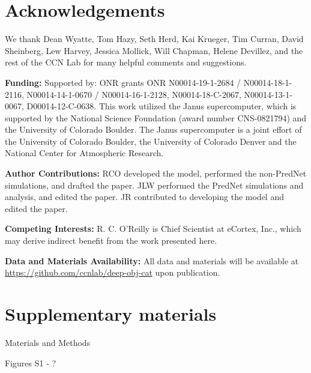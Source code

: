 \documentclass[12pt,twoside]{article}
\newif\myifpdf
\begin{document}


\section*{Acknowledgements}

We thank Dean Wyatte, Tom Hazy, Seth Herd, Kai Krueger, Tim Curran, David Sheinberg, Lew Harvey, Jessica Mollick, Will Chapman, Helene Devillez, and the rest of the CCN Lab for many helpful comments and suggestions.

  {\bf Funding:} Supported by: ONR grants ONR N00014-19-1-2684 / N00014-18-1-2116, N00014-14-1-0670 / N00014-16-1-2128, N00014-18-C-2067, N00014-13-1-0067, D00014-12-C-0638.  This work utilized the Janus supercomputer, which is supported by the National Science Foundation (award number CNS-0821794) and the University of Colorado Boulder. The Janus supercomputer is a joint effort of the University of Colorado Boulder, the University of Colorado Denver and the National Center for Atmospheric Research.

 {\bf Author Contributions:} RCO developed the model, performed the non-PredNet simulations, and drafted the paper. JLW performed the PredNet simulations and analysis, and edited the paper.  JR contributed to developing the model and edited the paper.

  {\bf Competing Interests:} R. C. O'Reilly is Chief Scientist at eCortex, Inc., which may derive indirect benefit from the work presented here.

{\bf Data and Materials Availability:}  All data and materials will be available at \url{https://github.com/ccnlab/deep-obj-cat} upon publication.

\section*{Supplementary materials}

Materials and Methods

Figures S1 - ?
\end{document}
